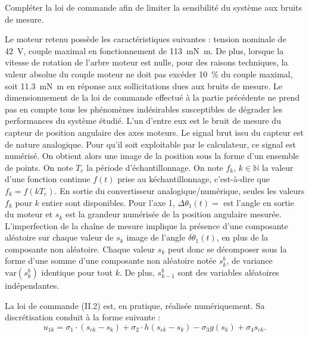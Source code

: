 \setcounter{exo}{0}


\begin{obj}
Compléter la loi de commande afin de limiter la sensibilité du système aux bruits de mesure.
\end{obj}

Le moteur retenu possède les caractéristiques suivantes : tension nominale de \SI{42}{V}, couple maximal en fonctionnement
de \SI{113}{mN.m}. De plus, lorsque la vitesse de rotation de l’arbre moteur est nulle, pour des raisons
techniques, la valeur absolue du couple moteur ne doit pas excéder \SI{10}{\%} du couple maximal, soit \SI{11,3}{mN.m} en réponse aux sollicitations dues aux bruits de mesure.
Le dimensionnement de la loi de commande effectué à la partie précédente ne prend pas en compte tous les
phénomènes indésirables susceptibles de dégrader les performances du système étudié. L’un d’entre eux est le
bruit de mesure du capteur de position angulaire des axes moteurs. Le signal brut issu du capteur est de nature
analogique. Pour qu’il soit exploitable par le calculateur, ce signal est numérisé. On obtient alors une image de
la position sous la forme d’un ensemble de points. On note $T_e$ la période d’échantillonnage.
On note $f_k$, $k\in\mathbb{N}$ la valeur d’une fonction continue $f(t)$ prise au k\ieme échantillonnage, c’est-à-dire que
$f_k=f\left(kT_e\right)$. En sortie du convertisseur analogique/numérique, seules les valeurs $f_k$ pour $k$ entier sont disponibles.
Pour l’axe 1, $\Delta \theta_1(t)=$ est l’angle en sortie du moteur et $s_k$ est la grandeur numérisée de la position angulaire
mesurée.
L’imperfection de la chaîne de mesure implique la présence d’une composante aléatoire sur chaque valeur de $s_k$
image de l’angle $\delta \theta_1(t)$, en plus de la composante non aléatoire. Chaque valeur $s_k$ peut donc se décomposer
sous la forme d’une somme d’une composante non aléatoire notée $s_k^b$, de variance
$\text{var}\left( s_k^b\right)$ identique pour tout $k$. De plus, $s_{k-1}^b$ sont des variables aléatoires indépendantes.


La loi de commande (II.2) est, en pratique, réalisée numériquement. Sa discrétisation conduit à la forme suivante :
$$
u_{1k} = \sigma_1 \cdot\left(s_{ck}-s_k \right)+\sigma_2 \cdot h\left(s_{ck}-s_k \right)  -\sigma_3 g \left(s_k \right) + \sigma_4 s_{ck}.
$$

